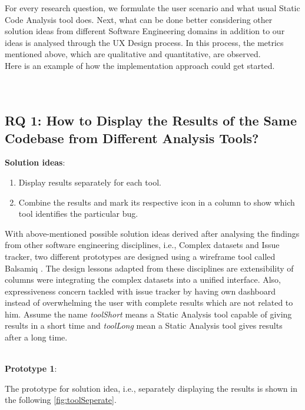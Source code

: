 For every research question, we formulate the user scenario and what usual Static Code Analysis tool does. Next, what can be done better considering other solution ideas from different Software Engineering domains in addition to our ideas is analysed through the UX Design process. In this process, the metrics mentioned above, which are qualitative and quantitative, are observed. \\

Here is an example of how the implementation approach could get started. \\ \\ \\

\subsection{RQ 1: How to Display the Results of the Same Codebase from Different Analysis Tools?} 


\textbf{Solution ideas}: \\ 
\begin{enumerate}
\item  Display results separately for each tool.
\item  Combine the results and mark its respective icon in a column to show which tool identifies the particular bug.
\end{enumerate}

With above-mentioned possible solution ideas derived after analysing the findings from other software engineering disciplines, i.e., Complex datasets and Issue tracker, two different prototypes are designed using a wireframe tool called Balsamiq \cite{B}. The design lessons adapted from these disciplines are extensibility of columns were integrating the complex datasets into a unified interface. Also, expressiveness concern tackled with issue tracker by having own dashboard instead of overwhelming the user with complete results which are not related to him. Assume the name \textit{toolShort} means a Static Analysis tool capable of giving results in a short time and \textit{toolLong} mean a Static Analysis tool gives results after a long time. \\ \\ 

\clearpage

\textbf{Prototype 1}:

The prototype for solution idea, i.e., separately displaying the results is shown in the following \autoref{fig:toolSeperate}. \\ 

